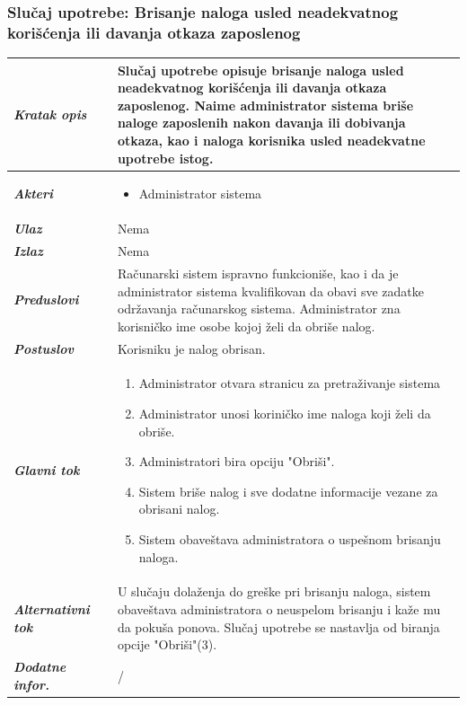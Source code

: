 \documentclass[20pt]{article}
\begin{document}
\subsubsection{\bfseries \large Slu\v{c}aj upotrebe: Brisanje naloga usled neadekvatnog kori\v {s}\' cenja ili davanja otkaza zaposlenog}
\begin{center}
\begin{longtable}{p{0.23\linewidth} p{0.77\linewidth}}
\hline
 {\it \bfseries Kratak opis} & Slu\v {c}aj upotrebe opisuje brisanje naloga usled neadekvatnog kori\v {s}\'cenja ili davanja otkaza zaposlenog. Naime administrator sistema bri\v {s}e naloge zaposlenih nakon davanja ili dobivanja otkaza, kao i naloga korisnika usled neadekvatne upotrebe istog.\\ 
 \hline
 {\it \bfseries Akteri} & \begin{itemize}
    \item Administrator sistema
\end{itemize}\\
\hline

 {\it \bfseries Ulaz} & Nema\\
 \hline
 
 {\it \bfseries Izlaz} & Nema\\
 \hline
 
 {\it \bfseries Preduslovi} & Ra\v {c}unarski sistem ispravno funkcioni\v {s}e, kao i da je administrator sistema kvalifikovan da obavi sve zadatke odr\v {z}avanja ra\v {c}unarskog sistema. Administrator zna korisni\v {c}ko ime osobe kojoj \v {z}eli da obri\v {s}e nalog.\\
 \hline
 
 {\it \bfseries Postuslov} & Korisniku je nalog obrisan.\\
 \hline

     {\it \bfseries Glavni tok} &  
     \begin{enumerate}
         \item Administrator otvara stranicu za pretra\v {z}ivanje sistema
         \item Administrator unosi korini\v {c}ko ime naloga koji \v {z}eli da obri\v {s}e.
         \item Administratori bira opciju "Obri\v {s}i".
         \item Sistem bri\v {s}e nalog i sve dodatne informacije vezane za obrisani nalog.
         \item Sistem obave\v {s}tava administratora o uspe\v {s}nom brisanju naloga.
    \end{enumerate}\\
 \hline
 {\it \bfseries Alternativni tok} & U slu\v {c}aju dola\v {z}enja do gre\v {s}ke pri brisanju naloga, sistem obave\v {s}tava administratora o neuspelom brisanju i ka\v {z}e mu da poku\v {s}a ponova. Slu\v {c}aj upotrebe se nastavlja od biranja opcije "Obri\v {s}i"(3).\\
 \hline
 {\it \bfseries Dodatne infor.} & /\\
 \hline


\end{longtable}
\end{center}
\end{document}
